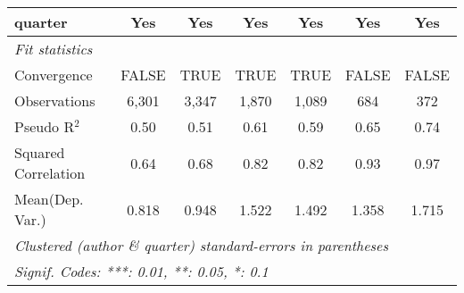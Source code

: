 \begin{tabular}{lcccccc}
   quarter                                                    & Yes          & Yes           & Yes          & Yes           & Yes         & Yes\\  
   \midrule
   \emph{Fit statistics}\\
   Convergence                                                &FALSE         & TRUE          & TRUE         & TRUE          & FALSE       & FALSE\\  
   Observations                                               & 6,301        & 3,347         & 1,870        & 1,089         & 684         & 372\\  
   Pseudo R$^2$                                               & 0.50         & 0.51          & 0.61         & 0.59          & 0.65        & 0.74\\  
   Squared Correlation                                        & 0.64         & 0.68          & 0.82         & 0.82          & 0.93        & 0.97\\  
Mean(Dep. Var.) & 0.818 & 0.948 & 1.522 & 1.492 & 1.358 & 1.715 \\
   \midrule \midrule
   \multicolumn{7}{l}{\emph{Clustered (author \& quarter) standard-errors in parentheses}}\\
   \multicolumn{7}{l}{\emph{Signif. Codes: ***: 0.01, **: 0.05, *: 0.1}}\\
\end{tabular}
\par\endgroup
